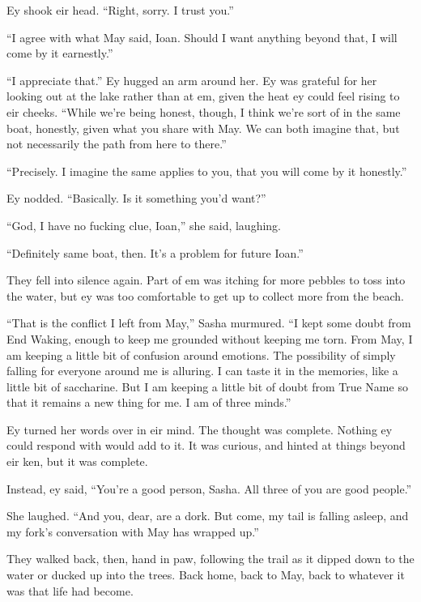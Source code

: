 Ey shook eir head. ``Right, sorry. I trust you.''

``I agree with what May said, Ioan. Should I want anything beyond that, I will come by it earnestly.''

``I appreciate that.'' Ey hugged an arm around her. Ey was grateful for her looking out at the lake rather than at em, given the heat ey could feel rising to eir cheeks. ``While we're being honest, though, I think we're sort of in the same boat, honestly, given what you share with May. We can both imagine that, but not necessarily the path from here to there.''

``Precisely. I imagine the same applies to you, that you will come by it honestly.''

Ey nodded. ``Basically. Is it something you'd want?''

``God, I have no fucking clue, Ioan,'' she said, laughing.

``Definitely same boat, then. It's a problem for future Ioan.''

They fell into silence again. Part of em was itching for more pebbles to toss into the water, but ey was too comfortable to get up to collect more from the beach.

``That is the conflict I left from May,'' Sasha murmured. ``I kept some doubt from End Waking, enough to keep me grounded without keeping me torn. From May, I am keeping a little bit of confusion around emotions. The possibility of simply falling for everyone around me is alluring. I can taste it in the memories, like a little bit of saccharine. But I am keeping a little bit of doubt from True Name so that it remains a new thing for me. I am of three minds.''

Ey turned her words over in eir mind. The thought was complete. Nothing ey could respond with would add to it. It was curious, and hinted at things beyond eir ken, but it was complete.

Instead, ey said, ``You're a good person, Sasha. All three of you are good people.''

She laughed. ``And you, dear, are a dork. But come, my tail is falling asleep, and my fork's conversation with May has wrapped up.''

They walked back, then, hand in paw, following the trail as it dipped down to the water or ducked up into the trees. Back home, back to May, back to whatever it was that life had become.
